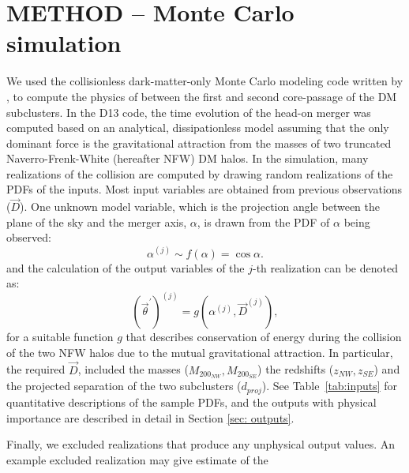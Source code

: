 \section{METHOD -- Monte Carlo simulation} 
We used the collisionless 
dark-matter-only Monte Carlo modeling code written by , to
compute the physics of between the first and second core-passage of the DM subclusters. 
In the D13 code, the time evolution of the
head-on merger was computed based on an analytical, dissipationless model
assuming that the only dominant force is the gravitational attraction from
the masses of two truncated Naverro-Frenk-White (hereafter NFW) DM halos. 
In the simulation, many realizations of the collision are
computed by drawing random realizations of the PDFs of the inputs. Most
input variables are obtained from previous observations ($\vec{D}$).  One
unknown model variable, which is the projection angle between the plane of the sky
and the merger axis, $\alpha$, is drawn from the PDF of $\alpha$ being
observed: 
\begin{equation}
	\alpha^{(j)} \sim f(\alpha) = \cos \alpha.
\end{equation}
and the calculation of the output variables of the $j$-th realization can be denoted as: 
\begin{equation}
	(\vec{\theta}^\prime)^{(j)} = g(\alpha^{(j)}, \vec{D}^{(j)}), 
\end{equation}    
for a suitable function $g$ that describes conservation of energy during the collision of the two NFW halos due to the mutual gravitational attraction.  In particular, the required $\vec{D}$, included the masses ($M_{200_{NW}},M_{200_{SE}}$) the redshifts ($z_{NW}, z_{SE}$) and the
projected separation of the two subclusters ($d_{proj}$).  See
Table~\ref{tab:inputs} for quantitative descriptions of the sample PDFs, and
the outputs with physical importance are described in detail in Section
\ref{sec: outputs}. \par
Finally, we excluded realizations that produce any unphysical output
values. An example excluded realization may give estimate of the
